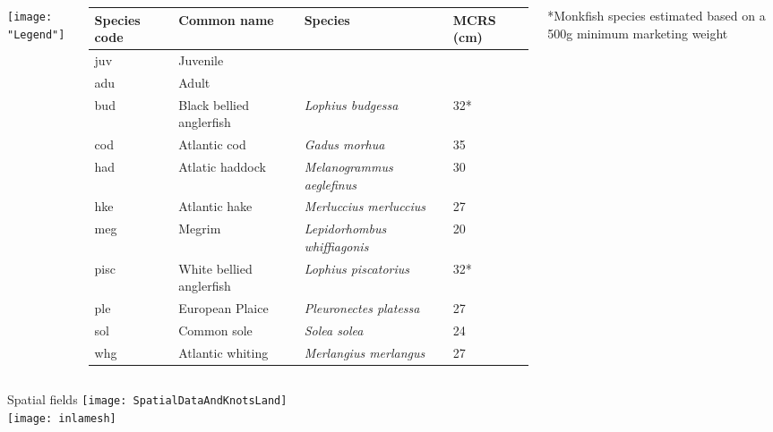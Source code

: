 \documentclass[xcolor=x11names,compress]{beamer}
\renewcommand{\(}{\begin{columns}}
\renewcommand{\)}{\end{columns}}
\newcommand{\<}[1]{\begin{column}{#1}}
\renewcommand{\>}{\end{column}}
\begin{document}
\begin{frame}

\begin{columns}
\texttt{[image: "Legend"]}

\begin{table}[!htb]
	\tiny
	\center
	\begin{tabular}{ p{1cm} p{2cm} p{3cm} p{1cm}}
		\hline
		Species code & Common name              & Species & MCRS (cm) \\
		\hline
		juv          & Juvenile                 & & \\
		adu          & Adult                    & & \\
		\hline
		bud          & Black bellied anglerfish & \textit{Lophius budgessa} & 32* \\
		cod          & Atlantic cod             & \textit{Gadus morhua} & 35 \\
		had          & Atlatic haddock          & \textit{Melanogrammus	aeglefinus} & 30 \\
		hke          & Atlantic hake            & \textit{Merluccius merluccius} & 27 \\
		meg          & Megrim                   & \textit{Lepidorhombus whiffiagonis} & 20\\
		pisc         & White bellied anglerfish & \textit{Lophius piscatorius} & 32* \\
		ple          & European Plaice          & \textit{Pleuronectes platessa} & 27 \\
		sol          & Common sole              & \textit{Solea solea} & 24 \\
		whg          & Atlantic whiting         & \textit{Merlangius merlangus} & 27 \\
		\hline
		\end{tabular}
		*Monkfish species estimated based on a 500g minimum marketing weight


\end{table}

\end{columns}
\end{frame}

\begin{frame}{Spatial fields}
\centering
\texttt{[image: SpatialDataAndKnotsLand]} \\
\vspace{-0.5cm}
\texttt{[image: inlamesh]}

\end{frame}
\end{document}
